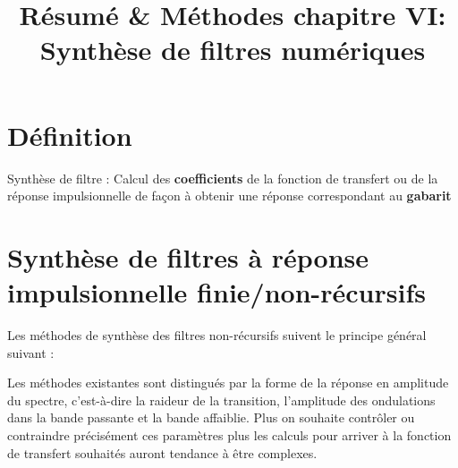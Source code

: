 \documentclass[11pt,a4paper]{article}
\begin{document}
\title{Résumé \& Méthodes chapitre VI: Synthèse de filtres numériques}
\maketitle

\section{Définition}
Synthèse de filtre :  Calcul des \textbf{coefficients} de la fonction  de transfert ou de la réponse impulsionnelle de façon à obtenir une réponse correspondant au \textbf{gabarit}

\section{Synthèse de filtres à réponse impulsionnelle finie/non-récursifs}
Les méthodes de synthèse des filtres non-récursifs suivent le principe général suivant  :
\begin{center}
\end{center}

Les méthodes existantes sont distingués par la forme de la réponse en amplitude du spectre, c'est-à-dire la raideur de la transition, l'amplitude des ondulations dans la bande passante et la bande affaiblie. Plus on souhaite contrôler ou contraindre précisément ces paramètres plus les calculs pour arriver à la fonction de transfert souhaités auront tendance à être complexes.
\end{document}
